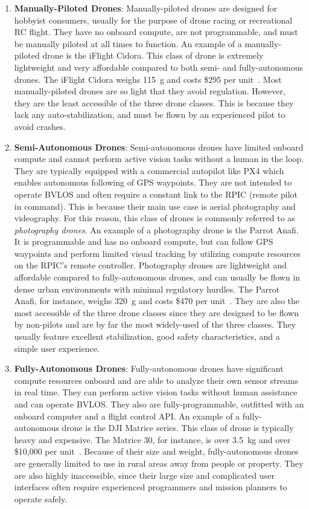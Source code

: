 \begin{enumerate}
    \item \textbf{Manually-Piloted Drones}: Manually-piloted drones are designed for hobbyist consumers, usually for the purpose of drone racing or recreational RC flight. They have no onboard compute, are not programmable, and must be manually piloted at all times to function. An example of a manually-piloted drone is the iFlight Cidora. This class of drone is extremely lightweight and very affordable compared to both semi- and fully-autonomous drones. The iFlight Cidora weighs 115~g and costs \$295 per unit~\cite{Cidora}. Most manually-piloted drones are so light that they avoid regulation. However, they are the least accessible of the three drone classes. This is because they lack any auto-stabilization, and must be flown by an experienced pilot to avoid crashes.
    \item \textbf{Semi-Autonomous Drones}: Semi-autonomous drones have limited onboard compute and cannot perform active vision tasks without a human in the loop. They are typically equipped with a commercial autopilot like PX4 which enables autonomous following of GPS waypoints. They are not intended to operate BVLOS and often require a constant link to the RPIC (remote pilot in command). This is because their main use case is aerial photography and videography. For this reason, this class of drones is commonly referred to as \textit{photography drones}. An example of a photography drone is the Parrot Anafi. It is programmable and has no onboard compute, but can follow GPS waypoints and perform limited visual tracking by utilizing compute resources on the RPIC's remote controller. Photography drones are lightweight and affordable compared to fully-autonomous drones, and can usually be flown in dense urban environments with minimal regulatory hurdles. The Parrot Anafi, for instance, weighs 320~g and costs \$470 per unit~\cite{ParrotAnafi}. They are also the most accessible of the three drone classes since they are designed to be flown by non-pilots and are by far the most widely-used of the three classes. They usually feature excellent stabilization, good safety characteristics, and a simple user experience. 
    \newpage
    \item \textbf{Fully-Autonomous Drones}: Fully-autonomous drones have significant compute resources onboard and are able to analyze their own sensor streams in real time. They can perform active vision tasks without human assistance and can operate BVLOS. They also are fully-programmable, outfitted with an onboard computer and a flight control API. An example of a fully-autonomous drone is the DJI Matrice series. This class of drone is typically heavy and expensive. The Matrice 30, for instance, is over 3.5~kg and over \$10,000 per unit~\cite{Matrice30T}. Because of their size and weight, fully-autonomous drones are generally limited to use in rural areas away from people or property. They are also highly inaccessible, since their large size and complicated user interfaces often require experienced programmers and mission planners to operate safely. 
\end{enumerate}
